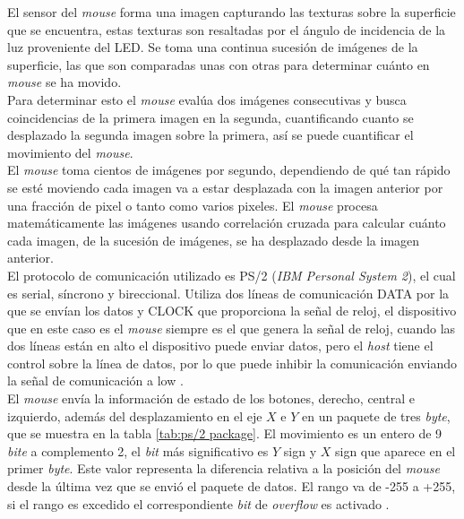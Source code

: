 \documentclass{iccmemoria}
\begin{document}
El sensor del \emph{mouse} forma una imagen capturando las texturas sobre la superficie que se encuentra, estas texturas son resaltadas por el ángulo de incidencia de la luz proveniente del LED. Se toma una continua sucesión de imágenes de la superficie, las que son comparadas unas con otras para determinar cuánto en \emph{mouse} se ha movido.\\

Para determinar esto el \emph{mouse} evalúa dos imágenes consecutivas y busca coincidencias de la primera imagen en la segunda, cuantificando cuanto se desplazado la segunda imagen sobre la primera, así se puede cuantificar el movimiento del \emph{mouse}.\\

El \emph{mouse} toma cientos de imágenes por segundo, dependiendo de qué tan rápido se esté moviendo cada imagen va a estar desplazada con la imagen anterior por una fracción de pixel o tanto como varios pixeles. El \emph{mouse} procesa matemáticamente las imágenes usando correlación cruzada para calcular cuánto cada imagen, de la sucesión de imágenes, se ha desplazado desde la imagen anterior.\\

El protocolo de comunicación utilizado es PS/2 (\emph{IBM Personal System 2}), el cual es serial, síncrono y bireccional. Utiliza dos líneas de comunicación DATA por la que se envían los datos y CLOCK que proporciona la señal de reloj, el dispositivo que en este caso es el \emph{mouse} siempre es el que genera la señal de reloj, cuando las dos líneas están en alto el dispositivo puede enviar datos, pero el \emph{host} tiene el control sobre la línea de datos, por lo que puede inhibir la comunicación enviando la señal de comunicación a low \cite{ps2protocol}.\\

El \emph{mouse} envía la información de estado de los botones, derecho, central e izquierdo, además del desplazamiento en el eje $X$ e $Y$ en un paquete de tres \emph{byte}, que se muestra en la tabla \ref{tab:ps/2 package}. El movimiento es un entero de 9 \emph{bite} a complemento 2, el \emph{bit} más significativo es $Y$ sign y $X$ sign que aparece en el primer \emph{byte}. Este valor representa la diferencia relativa a la posición del \emph{mouse} desde la última vez que se envió el paquete de datos. El rango va de -255 a +255, si el rango es excedido el correspondiente \emph{bit} de \emph{overflow} es activado \cite{ps2mouse}.\\
\end{document}
